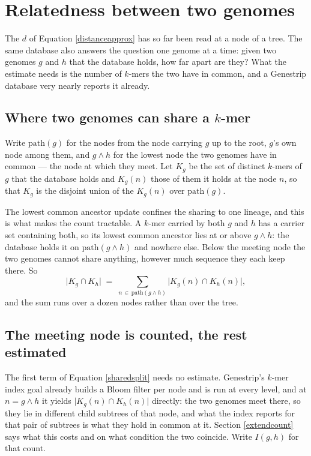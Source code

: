 \documentclass[pdflatex,sn-vancouver-num]{sn-jnl}
\begin{document}
\section{Relatedness between two genomes}\label{pairwise}

The $d$ of Equation \eqref{distanceapprox} has so far been read at a node of a tree. The same database also answers the
question one genome at a time: given two genomes $g$ and $h$ that the database holds, how far apart
are they? What the estimate needs is the number of $k$-mers the two have in common, and a Genestrip
database very nearly reports it already.

\subsection{Where two genomes can share a $k$-mer}

Write $\mathrm{path}(g)$ for the nodes from the node carrying $g$ up to the root, $g$'s own node
among them, and $g \wedge h$ for the lowest node the two genomes have in common --- the node at which
they meet. Let $K_g$ be the set of distinct $k$-mers of $g$ that the database holds and $K_g(n)$
those of them it holds at the node $n$, so that $K_g$ is the disjoint union of the $K_g(n)$ over
$\mathrm{path}(g)$.

The lowest common ancestor update confines the sharing to one lineage, and this is what makes the
count tractable. A $k$-mer carried by both $g$ and $h$ has a carrier set containing both, so its
lowest common ancestor lies at or above $g \wedge h$: the database holds it on
$\mathrm{path}(g \wedge h)$ and nowhere else. Below the meeting node the two genomes cannot share
anything, however much sequence they each keep there. So
%
\begin{equation}
  \lvert K_g \cap K_h \rvert \;=\; \sum_{n \,\in\, \mathrm{path}(g \wedge h)}
    \lvert K_g(n) \cap K_h(n) \rvert ,
  \label{sharedsplit}
\end{equation}
%
and the sum runs over a dozen nodes rather than over the tree.

\subsection{The meeting node is counted, the rest estimated}

The first term of Equation \eqref{sharedsplit} needs no estimate. Genestrip's $k$-mer index goal
already builds a Bloom filter per node and is run at every level, and at $n = g \wedge h$ it yields
$\lvert K_g(n) \cap K_h(n) \rvert$ directly: the two genomes meet there, so they lie in different child
subtrees of that node, and what the index reports for that pair of subtrees is what they hold in
common at it. Section \ref{extendcount} says what this costs and on what condition the two coincide.
Write $I(g,h)$ for that count.
\end{document}
